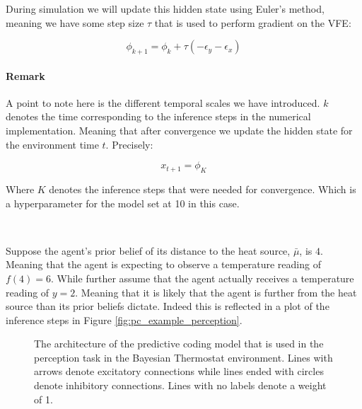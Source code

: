 \documentclass{article}
\begin{document}
During simulation we will update this hidden state using Euler's method, meaning we have some step size $\tau$ that is used to perform gradient on the VFE:

\begin{equation}
	\phi_{k + 1} = \phi_{k} + \tau \left( - \epsilon_y - \epsilon_x \right) 
\end{equation}

\paragraph{Remark} A point to note here is the different temporal scales we have introduced. $k$ denotes the time corresponding to the inference steps in the numerical implementation. Meaning that after convergence we update the hidden state for the environment time $t$. Precisely:

\begin{equation}
	x_{t + 1} = \phi_K
\end{equation}

Where $K$ denotes the inference steps that were needed for convergence. Which is a hyperparameter for the model set at 10 in this case.

\

Suppose the agent's prior belief of its distance to the heat source, $\bar{\mu}$, is $4$. Meaning that the agent is expecting to observe a temperature reading of $f(4) = 6$. While further assume that the agent actually receives a temperature reading of $y = 2$. Meaning that it is likely that the agent is further from the heat source than its prior beliefs dictate. Indeed this is reflected in a plot of the inference steps in Figure \ref{fig:pc_example_perception}.

\begin{figure}[h]
    \centering

\caption{The architecture of the predictive coding model that is used in the perception task in the Bayesian Thermostat environment. Lines with arrows denote excitatory connections while lines ended with circles denote inhibitory connections. Lines with no labels denote a weight of 1.}
\label{fig:pred_coding}
\end{figure}
\end{document}
